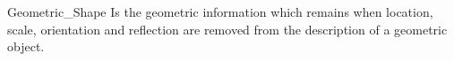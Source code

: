 \documentclass[preview]{standalone}
\begin{document}
\begin{defn*}{Geometric_Shape}
  Is the geometric information which remains when location, scale, orientation and reflection are removed from the description of a geometric object.
\end{defn*}
\end{document}
